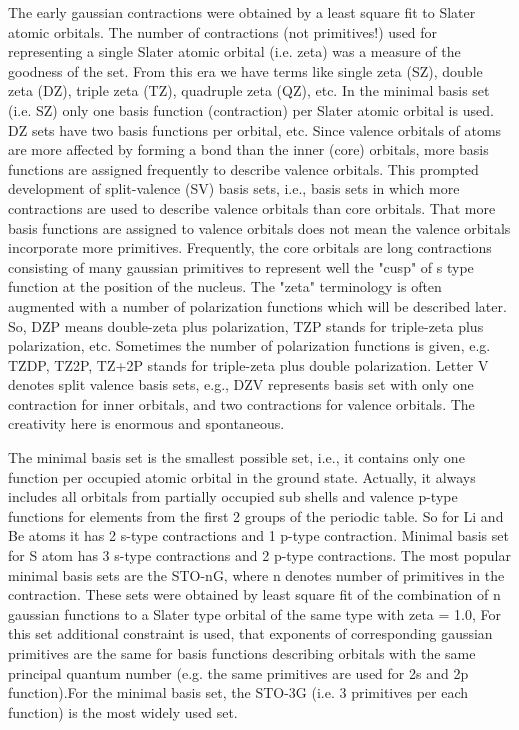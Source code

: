 The early gaussian contractions were obtained by a least square fit to
Slater atomic orbitals. The number of contractions (not primitives!)
used for representing a single Slater atomic orbital (i.e. zeta) was a
measure of the goodness of the set. From this era we have terms like
single zeta (SZ), double zeta (DZ), triple zeta (TZ), quadruple zeta
(QZ), etc. In the minimal basis set (i.e. SZ) only one basis function
(contraction) per Slater atomic orbital is used. DZ sets have two
basis functions per orbital, etc. Since valence orbitals of atoms are
more affected by forming a bond than the inner (core) orbitals, more
basis functions are assigned frequently to describe valence
orbitals. This prompted development of split-valence (SV) basis sets,
i.e., basis sets in which more contractions are used to describe
valence orbitals than core orbitals. That more basis functions are
assigned to valence orbitals does not mean the valence orbitals
incorporate more primitives.  Frequently, the core orbitals are long
contractions consisting of many gaussian primitives to represent well
the "cusp" of s type function at the position of the nucleus. The
"zeta" terminology is often augmented with a number of polarization
functions which will be described later. So, DZP means double-zeta
plus polarization, TZP stands for triple-zeta plus polarization,
etc. Sometimes the number of polarization functions is given,
e.g. TZDP, TZ2P, TZ+2P stands for triple-zeta plus double
polarization. Letter V denotes split valence basis sets, e.g., DZV
represents basis set with only one contraction for inner orbitals, and
two contractions for valence orbitals. The creativity here is enormous
and spontaneous.

The minimal basis set is the smallest possible set, i.e., it contains
only one function per occupied atomic orbital in the ground
state. Actually, it always includes all orbitals from partially
occupied sub shells and valence p-type functions for elements from the
first 2 groups of the periodic table. So for Li and Be atoms it has 2
s-type contractions and 1 p-type contraction. Minimal basis set for S
atom has 3 s-type contractions and 2 p-type contractions.  The most
popular minimal basis sets are the STO-nG, where n denotes number of
primitives in the contraction. These sets were obtained by least
square fit of the combination of n gaussian functions to a Slater type
orbital of the same type with zeta = 1.0, For this set additional
constraint is used, that exponents of corresponding gaussian
primitives are the same for basis functions describing orbitals with
the same principal quantum number (e.g. the same primitives are used
for 2s and 2p function).For the minimal basis set, the STO-3G (i.e. 3
primitives per each function) is the most widely used set.

